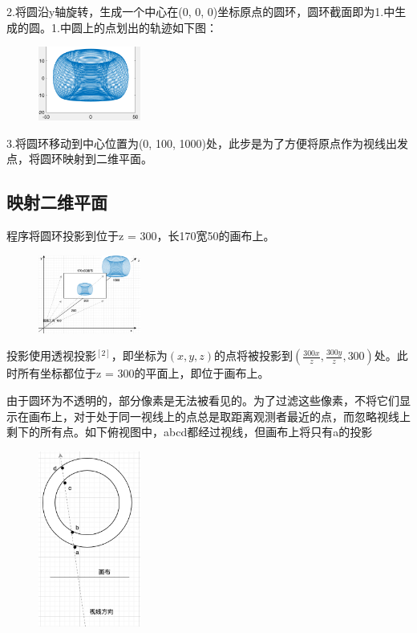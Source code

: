 \documentclass[UTF8]{ctexart}
\begin{document}
2.将圆沿y轴旋转，生成一个中心在(0, 0, 0)坐标原点的圆环，圆环截面即为1.中生成的圆。1.中圆上的点划出的轨迹如下图：
\begin{figure}[H] %
  \centering %
  \includegraphics[width=0.3\textwidth]{images/3d-donout.png} %
\end{figure}

3.将圆环移动到中心位置为(0, 100, 1000)处，此步是为了方便将原点作为视线出发点，将圆环映射到二维平面。

\subsection{映射二维平面}

程序将圆环投影到位于z = 300，长170宽50的画布上。
\begin{figure}[H] %
  \centering %
  \includegraphics[width=0.3\textwidth]{images/canvas_view.png} %
\end{figure}

投影使用透视投影$^{[2]}$，即坐标为$(x, y, z)$的点将被投影到$(\frac{300x}{z}, \frac{300y}{z}, 300)$处。此时所有坐标都位于z = 300的平面上，即位于画布上。

由于圆环为不透明的，部分像素是无法被看见的。为了过滤这些像素，不将它们显示在画布上，对于处于同一视线上的点总是取距离观测者最近的点，而忽略视线上剩下的所有点。如下俯视图中，abcd都经过视线，但画布上将只有a的投影
\begin{figure}[H] %
  \centering %
  \includegraphics[width=0.3\textwidth]{images/bird-view.png} %
\end{figure}
\end{document}
